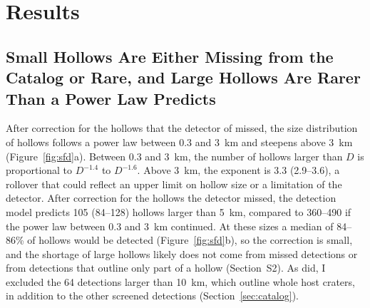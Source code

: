 \documentclass[article,review]{planetary}
\begin{document}
\FloatBarrier
\section{Results}
\label{sec:results}

\subsection{Small Hollows Are Either Missing from the Catalog or Rare, and Large Hollows Are Rarer Than a Power Law Predicts}
\label{sec:sfd}
After correction for the hollows that the detector of \textcite{bickel2025} missed, the size distribution of hollows follows a power law between 0.3 and 3~km and steepens above 3~km (Figure~\ref{fig:sfd}a). Between 0.3 and 3~km, the number of hollows larger than $D$ is proportional to $D^{-1.4}$ to $D^{-1.6}$. Above 3~km, the exponent is 3.3 (2.9--3.6), a rollover that could reflect an upper limit on hollow size or a limitation of the detector. After correction for the hollows the detector missed, the detection model predicts 105 (84--128) hollows larger than 5~km, compared to 360--490 if the power law between 0.3 and 3~km continued. At these sizes a median of 84--86\% of hollows would be detected (Figure~\ref{fig:sfd}b), so the correction is small, and the shortage of large hollows likely does not come from missed detections or from detections that outline only part of a hollow (Section~S2). As \textcite{bickel2025} did, I excluded the 64 detections larger than 10~km, which outline whole host craters, in addition to the other screened detections (Section~\ref{sec:catalog}).
\end{document}
